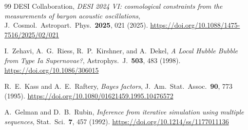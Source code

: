 \documentclass[12pt,a4paper]{article}
\theoremstyle{plain}
\theoremstyle{definition}
\theoremstyle{remark}
\begin{document}
\begin{thebibliography}{99}
DESI Collaboration, 
\emph{DESI 2024 VI: cosmological constraints from the measurements of baryon acoustic oscillations}, 
J.\ Cosmol.\ Astropart.\ Phys.\ \textbf{2025}, 021 (2025). 
\url{https://doi.org/10.1088/1475-7516/2025/02/021}

I.~Zehavi, A.~G.~Riess, R.~P.~Kirshner, and A.~Dekel, 
\emph{A Local Hubble Bubble from Type Ia Supernovae?}, 
Astrophys.\ J.\ \textbf{503}, 483 (1998). 
\url{https://doi.org/10.1086/306015}

R.~E.~Kass and A.~E.~Raftery, 
\emph{Bayes factors}, 
J.\ Am.\ Stat.\ Assoc.\ \textbf{90}, 773 (1995). 
\url{https://doi.org/10.1080/01621459.1995.10476572}

A.~Gelman and D.~B.~Rubin, 
\emph{Inference from iterative simulation using multiple sequences}, 
Stat.\ Sci.\ \textbf{7}, 457 (1992). 
\url{https://doi.org/10.1214/ss/1177011136}

\end{thebibliography}
\end{document}
